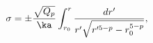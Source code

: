 \begin{equation}
\sigma = \pm \frac{\sqrt{Q_p}}{\ka} \int_{r_0}^r \frac{dr'}
{r'\sqrt{r'^{5-p}-r_0^{5-p}}},
\end{equation}

